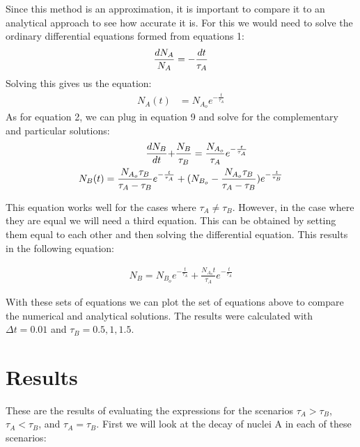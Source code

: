 \documentclass[pra,twocolumn,showpacs,amsmath,amssymb]{revtex4-2}
\begin{document}
Since this method is an approximation, it is important to compare it to an analytical approach to see how accurate it is. For this we would need to solve the ordinary differential equations formed from equations 1:
\begin{align}
    \frac{dN_A}{N_A} = - \frac{dt}{\tau_A} \notag
\end{align}
Solving this gives us the equation:
\begin{align}
    N_{A}(t) &= N_{A_{o}}e^{-\frac{t}{\tau_{A}}}
\end{align}
As for equation 2, we can plug in equation 9 and solve for the complementary and particular solutions:
\begin{align}
\frac{dN_B}{dt} + &\frac{N_B}{\tau_B} = \frac{N_{A_o}}{\tau_A}e^{-\frac{t}{\tau_{A}}} \notag \\
N_{B}(t) = \frac{N_{A_{o}} \tau_B}{\tau_A-\tau_B}e^{-\frac{t}{\tau_{A}}} &+ (N_{B_{o}} - \frac{N_{A_{o}} \tau_B}{\tau_A-\tau_B})e^{-\frac{t}{\tau_{B}}}
\end{align}

This equation works well for the cases where $\tau_A \neq \tau_B$. However, in the case where they are equal we will need a third equation. This can be obtained by setting them equal to each other and then solving the differential equation. This results in the following equation:

\begin{align}
    N_B = N_{B_o}e^{-\frac{t}{\tau_A}} + \frac{N_{A_o}t}{\tau_A}e^{-\frac{t}{\tau_A}}
\end{align}

With these sets of equations we can plot the set of equations above to compare the numerical and analytical solutions. The results were calculated with \(\Delta t = 0.01\) and \(\tau_B = 0.5 , 1 , 1.5\).

\section{Results} \label{sec:results}

These are the results of evaluating the expressions for the scenarios \(\tau_A > \tau_B\), \(\tau_A < \tau_B\), and \(\tau_A = \tau_B\). First we will look at the decay of nuclei A in each of these scenarios:
\end{document}
